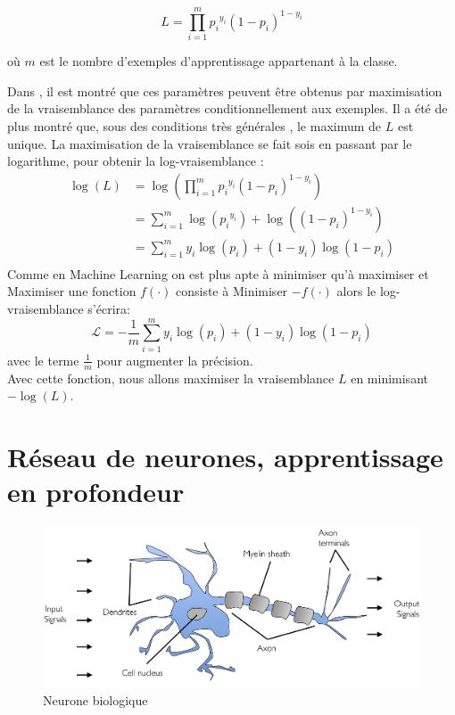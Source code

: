 	\begin{equation}\label{eq:likelyhood}
		L = \prod_{i=1}^{m} {p_i}^{y_i} (1-p_i)^{1-y_i}
	\end{equation}
	
	où $m$ est le nombre d'exemples d'apprentissage appartenant à la classe.
	
	Dans \cite{antoine2018apprentissage}, il est montré que ces paramètres peuvent être obtenus par maximisation de la vraisemblance des paramètres conditionnellement aux exemples. Il a été de plus montré que, sous des conditions très générales \cite{sarkar2017practical}, le maximum de $L$ est unique.
	La maximisation de la vraisemblance se fait sois en passant par le logarithme, pour obtenir la log-vraisemblance :
	\begin{equation}
		\begin{split}
			\log(L)  & = \log(\prod_{i=1}^{m} {p_i}^{y_i} (1-p_i)^{1-y_i}) \\
			& =\sum_{i=1}^{m} \log( {p_i}^{y_i}) +\log((1-p_i)^{1-y_i})\\
			& =\sum_{i=1}^{m} {y_i}\log( {p_i}) +{(1-y_i)}\log(1-p_i)\\
		\end{split}
	\end{equation}
	Comme en Machine Learning on est plus apte à minimiser qu'à maximiser et Maximiser une fonction $f(\cdot)$ consiste à Minimiser $-f(\cdot)$ alors le log-vraisemblance s'écrira: 
	\begin{equation}\label{eq:log-likelyhood}
		\mathcal{L} = -\frac{1}{m}\sum_{i=1}^{m} {y_i}\log( {p_i}) +{(1-y_i)}\log(1-p_i)
	\end{equation}
	avec le terme $\frac{1}{m}$ pour augmenter la précision.\\
	Avec cette fonction, nous allons maximiser la vraisemblance $L$ en minimisant $-\log(L)$.	
		
	
	
\section{Réseau de neurones, apprentissage en profondeur}
	\begin{figure}[hth]%
		\centering
		\includegraphics[width=\textwidth]{images/neuron.png}
		\caption{Neurone biologique \cite{ml2008python}}
		\label{fig:bio_neuron}
	\end{figure}


